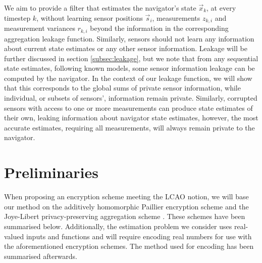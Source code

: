 \documentclass[10pt,letterpaper,oneside,twocolumn,journal]{IEEEtran}
\theoremstyle{definition}
\theoremstyle{definition}
\theoremstyle{remark}
\begin{document}
We aim to provide a filter that estimates the navigator's state $\vec{x}_k$, at every timestep $k$, without learning sensor positions $\vec{s}_i$, measurements $z_{k,i}$ and measurement variances $r_{k,i}$ beyond the information in the corresponding aggregation leakage function. Similarly, sensors should not learn any information about current state estimates or any other sensor information. Leakage will be further discussed in section \ref{subsec:leakage}, but we note that from any sequential state estimates, following known models, some sensor information leakage can be computed by the navigator. In the context of our leakage function, we will show that this corresponds to the global sums of private sensor information, while individual, or subsets of sensors', information remain private. Similarly, corrupted sensors with access to one or more measurements can produce state estimates of their own, leaking information about navigator state estimates, however, the most accurate estimates, requiring all measurements, will always remain private to the navigator.

% 
%                                                                            
%                                                                            
%                                                                            
% 

\section{Preliminaries} \label{sec:preliminaries}
When proposing an encryption scheme meeting the LCAO notion, we will base our method on the additively homomorphic Paillier encryption scheme \cite{paillierPublicKeyCryptosystemsBased1999} and the Joye-Libert privacy-preserving aggregation scheme \cite{joyeScalableSchemePrivacyPreserving2013}. These schemes have been summarised below. Additionally, the estimation problem we consider uses real-valued inputs and functions and will require encoding real numbers for use with the aforementioned encryption schemes. The method used for encoding has been summarised afterwards.
\end{document}
